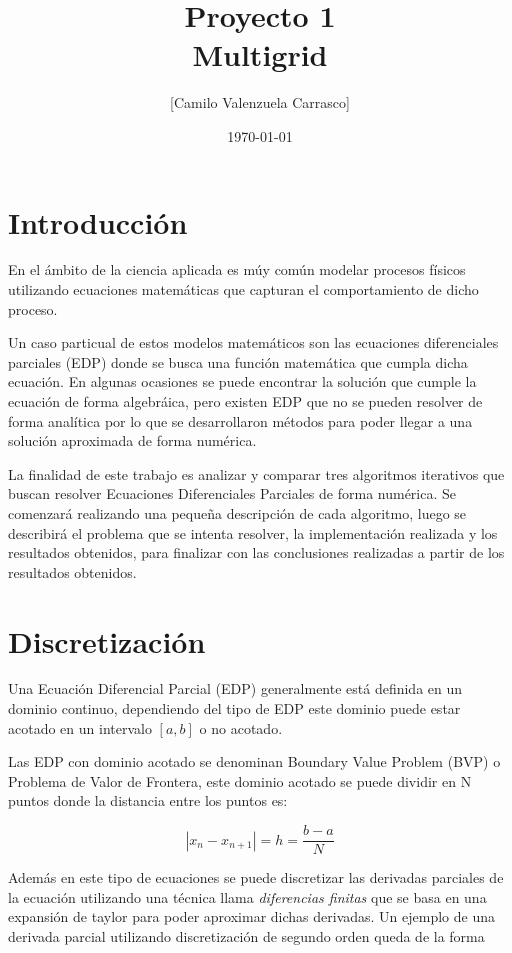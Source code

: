 \documentclass[letter, 10pt]{article}
\begin{document}
\title{Proyecto 1 \\ Multigrid}
\author{[Camilo Valenzuela Carrasco]}
\date{\today}
\maketitle


\section{Introducción}

En el ámbito de la ciencia aplicada es múy común modelar procesos físicos utilizando ecuaciones matemáticas que capturan el comportamiento de dicho proceso.

Un caso particual de estos modelos matemáticos son las ecuaciones diferenciales parciales (EDP) donde se busca una función matemática que cumpla dicha ecuación. En algunas ocasiones se puede encontrar la solución que cumple la ecuación de forma algebráica, pero existen EDP que no se pueden resolver de forma analítica por lo que se desarrollaron métodos para poder llegar a una solución aproximada de forma numérica.

La finalidad de este trabajo es analizar y comparar tres algoritmos iterativos que buscan resolver Ecuaciones Diferenciales Parciales de forma numérica. Se comenzará realizando una pequeña descripción de cada algoritmo, luego se describirá el problema que se intenta resolver, la implementación realizada y los resultados obtenidos, para finalizar con las conclusiones realizadas a partir de los resultados obtenidos.


\section{Discretización}

Una Ecuación Diferencial Parcial (EDP) generalmente está definida en un dominio continuo, dependiendo del tipo de EDP este dominio puede estar acotado en un intervalo $[a,b]$ o no acotado.

Las EDP con dominio acotado se denominan Boundary Value Problem (BVP) o Problema de Valor de Frontera, este dominio acotado se puede dividir en N puntos donde la distancia entre los puntos es:

\begin{equation}
     |x_n - x_{n+1}| =   h = \frac{b-a}{N}
\end{equation}

Además en este tipo de ecuaciones se puede discretizar las derivadas parciales de la ecuación utilizando una técnica llama \textit{diferencias finitas} que se basa en una expansión de taylor para poder aproximar dichas derivadas. Un ejemplo de una derivada parcial utilizando discretización de segundo orden queda de la forma
\end{document}
